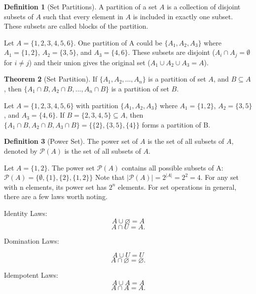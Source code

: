 \documentclass[12pt]{article}
\theoremstyle{definition}
\newtheorem{theorem}{Theorem}[section]
\newtheorem{definition}[theorem]{Definition}
\begin{document}
\vspace{12pt}


\begin{definition}[Set Partitions]
    A partition of a set $A$ is a collection of disjoint subsets of $A$ such that every element in $A$ is included in exactly one subset. These subsets are called blocks of the partition. 
\end{definition}

Let $A = \{1, 2, 3, 4, 5, 6\}$. One partition of A could be $\{A_1, A_2, A_3\}$ where $A_1 = \{1, 2\}$, $A_2 = \{3, 5\}$, and $A_3 = \{4, 6\}$. These subsets are disjoint ($A_i \cap A_j = \emptyset$ for $i \neq j$) and their union gives the original set ($A_1 \cup A_2 \cup A_3 = A$).




\vspace{12pt}

\begin{theorem}[Set Partition]
    If $\{A_1, A_2, \ldots, A_n\}$ is a partition of set $A$, and $B \subseteq A$, then  $\{A_1 \cap B, A_2 \cap B, \ldots, A_n \cap B\}$ is a partition of set $B$.
\end{theorem}

Let $A = \{1, 2, 3, 4, 5, 6\}$ with partition $\{A_1, A_2, A_3\}$ where $A_1 = \{1, 2\}$, $A_2 = \{3, 5\}$, and $A_3 = \{4, 6\}$. If $B = \{2, 3, 4, 5\} \subseteq A$, then $\{A_1 \cap B, A_2 \cap B, A_3 \cap B\} = \{\{2\}, \{3, 5\}, \{4\}\}$ forms a partition of B.





\begin{definition}[Power Set]
    The power set of $A$ is the set of all subsets of $A$, denoted by $\mathcal{P}(A)$ is the set of all subsets of $A$.
\end{definition}


Let $A = \{1, 2\}$. The power set $\mathcal{P}(A)$ contains all possible subsets of A:
$\mathcal{P}(A) = \{\emptyset, \{1\}, \{2\}, \{1, 2\}\}$
Note that $|\mathcal{P}(A)| = 2^{|A|} = 2^2 = 4$. For any set with n elements, its power set has $2^n$ elements. For set operations in general, there are a few laws worth noting.

Identity Laws:
$$
A \cup \varnothing = A$$$$ A \cap U = A.
$$

Domination Laws:

$$
A \cup U = U$$$$ A \cap \varnothing = \varnothing.
$$

Idempotent Laws:
$$
A \cup A = A$$$$ A \cap A = A.
$$
\end{document}
